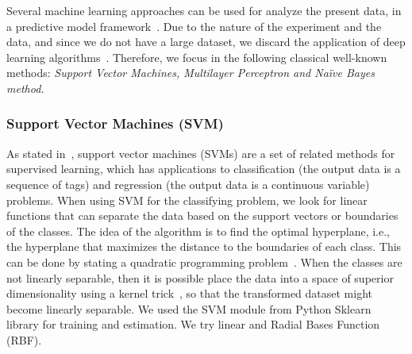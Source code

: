 \documentclass[10pt,leqno]{amsart}
\begin{document}
Several machine learning approaches can be used for analyze the present data, in a predictive model framework~\cite{vapnik2013nature,witten2002data,maimon2005data}. Due to the nature of the experiment and the data, and since we do not have a large dataset, we discard the application of deep learning algorithms~\cite{balas2019handbook}. Therefore, we focus in the following classical well-known methods: \textit{Support Vector Machines, Multilayer Perceptron and Na\"ive Bayes method.}

\subsubsection{Support Vector Machines (SVM)} As stated in~\cite[Chapter 12]{maimon2005data}, support vector machines (SVMs) are a set of related methods for supervised learning, which has applications to classification (the output data is a sequence of tags) and regression (the output data is a continuous variable) problems. When using SVM for the classifying problem, we look for linear functions that can separate the data based on the support vectors or boundaries of the classes. The idea of the algorithm is to find the optimal hyperplane, i.e., the hyperplane that maximizes the distance to the boundaries of each class. This can be done by stating a quadratic programming problem~\cite{vapnik2013nature}. When the classes are not linearly separable, then it is possible place the data into a space of superior dimensionality using a kernel trick~\cite{vapnik2013nature,maimon2005data}, so that the transformed dataset might become linearly separable. We used the SVM module from Python Sklearn library for training and estimation. We try linear and Radial Bases Function (RBF).
\end{document}
